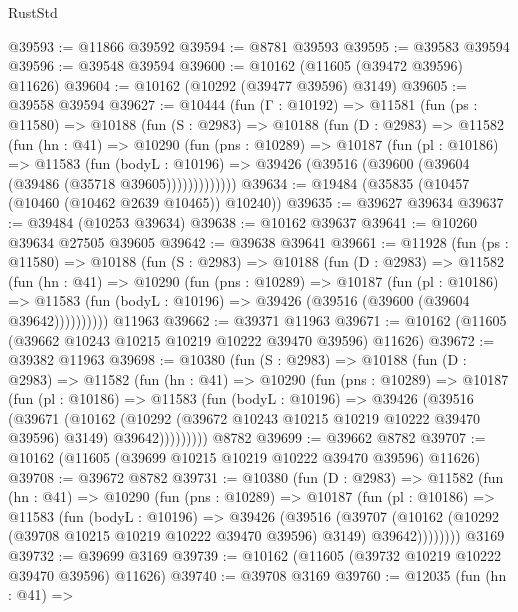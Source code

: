 \begin{lexlean}{RustStd}
\begin{coremodule}
@39593 := @11866 @39592
@39594 := @8781 @39593
@39595 := @39583 @39594
@39596 := @39548 @39594
@39600 := @10162 (@11605 (@39472 @39596) @11626)
@39604 := @10162 (@10292 (@39477 @39596) @3149)
@39605 := @39558 @39594
@39627 := @10444
    (fun (Γ : @10192) =>
    @11581
      (fun (ps : @11580) =>
      @10188
        (fun (S : @2983) =>
        @10188
          (fun (D : @2983) =>
          @11582
            (fun (hn : @41) =>
            @10290
              (fun (pns : @10289) =>
              @10187
                (fun (pl : @10186) =>
                @11583
                  (fun (bodyL : @10196) =>
                  @39426 (@39516 (@39600 (@39604 (@39486 (@35718 @39605)))))))))))))
@39634 := @19484 (@35835 (@10457 (@10460 (@10462 @2639 @10465)) @10240))
@39635 := @39627 @39634
@39637 := @39484 (@10253 @39634)
@39638 := @10162 @39637
@39641 := @10260 @39634 @27505 @39605
@39642 := @39638 @39641
@39661 := @11928
    (fun (ps : @11580) =>
    @10188
      (fun (S : @2983) =>
      @10188
        (fun (D : @2983) =>
        @11582
          (fun (hn : @41) =>
          @10290
            (fun (pns : @10289) =>
            @10187
              (fun (pl : @10186) =>
              @11583 (fun (bodyL : @10196) => @39426 (@39516 (@39600 (@39604 @39642))))))))))
    @11963
@39662 := @39371 @11963
@39671 := @10162 (@11605 (@39662 @10243 @10215 @10219 @10222 @39470 @39596) @11626)
@39672 := @39382 @11963
@39698 := @10380
    (fun (S : @2983) =>
    @10188
      (fun (D : @2983) =>
      @11582
        (fun (hn : @41) =>
        @10290
          (fun (pns : @10289) =>
          @10187
            (fun (pl : @10186) =>
            @11583
              (fun (bodyL : @10196) =>
              @39426
                (@39516
                  (@39671
                    (@10162
                      (@10292 (@39672 @10243 @10215 @10219 @10222 @39470 @39596) @3149)
                      @39642)))))))))
    @8782
@39699 := @39662 @8782
@39707 := @10162 (@11605 (@39699 @10215 @10219 @10222 @39470 @39596) @11626)
@39708 := @39672 @8782
@39731 := @10380
    (fun (D : @2983) =>
    @11582
      (fun (hn : @41) =>
      @10290
        (fun (pns : @10289) =>
        @10187
          (fun (pl : @10186) =>
          @11583
            (fun (bodyL : @10196) =>
            @39426
              (@39516
                (@39707
                  (@10162 (@10292 (@39708 @10215 @10219 @10222 @39470 @39596) @3149) @39642))))))))
    @3169
@39732 := @39699 @3169
@39739 := @10162 (@11605 (@39732 @10219 @10222 @39470 @39596) @11626)
@39740 := @39708 @3169
@39760 := @12035
    (fun (hn : @41) =>

\end{coremodule}
\end{lexlean}
